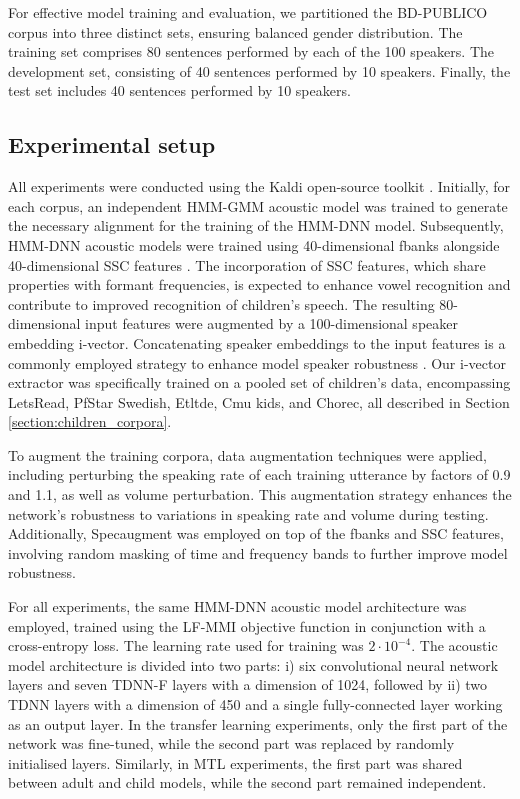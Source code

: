 For effective model training and evaluation, we partitioned the BD-PUBLICO corpus into three distinct sets, ensuring balanced gender distribution. The training set comprises 80 sentences performed by each of the 100 speakers. The development set, consisting of 40 sentences performed by 10 speakers. Finally, the test set includes 40 sentences performed by 10 speakers.


\subsection{Experimental setup}
\label{section:exp_setup}

All experiments were conducted using the Kaldi open-source toolkit \cite{kaldi}. Initially, for each corpus, an independent \ac{HMM-GMM} acoustic model was trained to generate the necessary alignment for the training of the \ac{HMM-DNN} model. Subsequently, \ac{HMM-DNN} acoustic models were trained using 40-dimensional \ac{fbanks} alongside 40-dimensional \ac{SSC} features \cite{ssc}. The incorporation of \ac{SSC} features, which share properties with formant frequencies, is expected to enhance vowel recognition and contribute to improved recognition of children's speech. The resulting 80-dimensional input features were augmented by a 100-dimensional speaker embedding i-vector. Concatenating speaker embeddings to the input features is a commonly employed strategy to enhance model speaker robustness \cite{ivector}. Our i-vector extractor was specifically trained on a pooled set of children's data, encompassing LetsRead, PfStar Swedish, Etltde, Cmu kids, and Chorec, all described in Section \ref{section:children_corpora}.

To augment the training corpora, data augmentation techniques were applied, including perturbing the speaking rate of each training utterance by factors of 0.9 and 1.1, as well as volume perturbation. This augmentation strategy enhances the network's robustness to variations in speaking rate and volume during testing. Additionally, Specaugment \cite{specaugment} was employed on top of the \ac{fbanks} and \ac{SSC} features, involving random masking of time and frequency bands to further improve model robustness.

For all experiments, the same \ac{HMM-DNN} acoustic model architecture was employed, trained using the \ac{LF-MMI} objective function in conjunction with a cross-entropy loss. The learning rate used for training was $2 \cdot 10^{-4}$. The acoustic model architecture is divided into two parts: i) six convolutional neural network layers and seven \ac{TDNN-F} layers with a dimension of 1024, followed by ii) two \ac{TDNN} layers with a dimension of 450 and a single fully-connected layer working as an output layer. In the transfer learning experiments, only the first part of the network was fine-tuned, while the second part was replaced by randomly initialised layers. Similarly, in \ac{MTL} experiments, the first part was shared between adult and child models, while the second part remained independent. 

